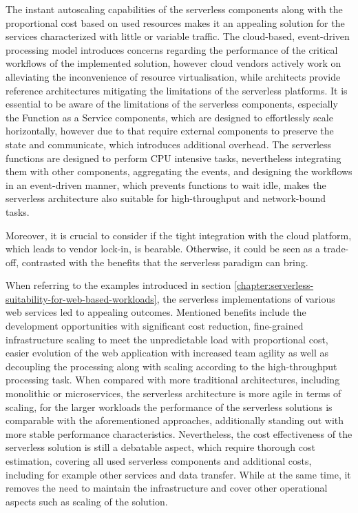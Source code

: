 The instant autoscaling capabilities of the serverless components along with the proportional cost based on used resources makes it an appealing solution for the services characterized with little or variable traffic.
The cloud-based, event-driven processing model introduces concerns regarding the performance of the critical workflows of the implemented solution, however cloud vendors actively work on alleviating the inconvenience of resource virtualisation, while architects provide reference architectures mitigating the limitations of the serverless platforms.
It is essential to be aware of the limitations of the serverless components, especially the Function as a Service components, which are designed to effortlessly scale horizontally, however due to that require external components to preserve the state and communicate, which introduces additional overhead.
The serverless functions are designed to perform CPU intensive tasks, nevertheless integrating them with other components, aggregating the events, and designing the workflows in an event-driven manner, which prevents functions to wait idle, makes the serverless architecture also suitable for high-throughput and network-bound tasks.

Moreover, it is crucial to consider if the tight integration with the cloud platform, which leads to vendor lock-in, is bearable.
Otherwise, it could be seen as a trade-off, contrasted with the benefits that the serverless paradigm can bring.

When referring to the examples introduced in section \ref{chapter:serverless-suitability-for-web-based-workloads}, the serverless implementations of various web services led to appealing outcomes.
Mentioned benefits include the development opportunities with significant cost reduction, fine-grained infrastructure scaling to meet the unpredictable load with proportional cost, easier evolution of the web application with increased team agility as well as decoupling the processing along with scaling according to the high-throughput processing task.
When compared with more traditional architectures, including monolithic or microservices, the serverless architecture is more agile in terms of scaling, for the larger workloads the performance of the serverless solutions is comparable with the aforementioned approaches, additionally standing out with more stable performance characteristics.
Nevertheless, the cost effectiveness of the serverless solution is still a debatable aspect, which require thorough cost estimation, covering all used serverless components and additional costs, including for example other services and data transfer.
While at the same time, it removes the need to maintain the infrastructure and cover other operational aspects such as scaling of the solution.

